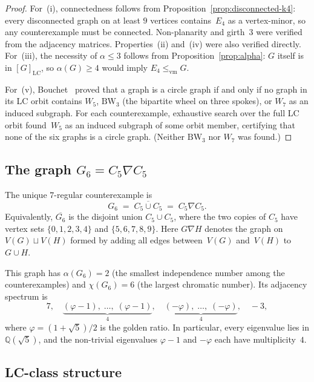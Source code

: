 \documentclass[11pt]{amsart}
\theoremstyle{definition}
\theoremstyle{remark}
\newcommand{\LC}{\mathrm{LC}}
\newcommand{\vm}{\leq_{\mathrm{vm}}}
\begin{document}
\begin{proof}
  For~(i), connectedness follows from
  Proposition~\ref{prop:disconnected-k4}: every disconnected graph on
  at least $9$ vertices contains~$E_4$ as a vertex-minor, so any
  counterexample must be connected.  Non-planarity and girth~$3$ were
  verified from the adjacency matrices.  Properties~(ii) and~(iv) were
  also verified directly.  For~(iii), the necessity of $\alpha\leq 3$
  follows from Proposition~\ref{prop:alpha}: $G$ itself is in
  $[G]_{\LC}$, so $\alpha(G)\geq 4$ would imply $E_4\vm G$.

  For~(v), Bouchet~\cite{Bouchet1994} proved that a graph is a circle
  graph if and only if no graph in its LC orbit contains $W_5$,
  $\mathrm{BW}_3$ (the bipartite wheel on three spokes), or $W_7$ as an
  induced subgraph.  For each
  counterexample, exhaustive search over the full LC orbit found~$W_5$
  as an induced subgraph of some orbit member, certifying that none of
  the six graphs is a circle graph.  (Neither $\mathrm{BW}_3$ nor $W_7$
  was found.)
\end{proof}


\subsection{The graph $G_6=C_5\nabla C_5$}

The unique $7$-regular counterexample is
\[
  G_6 \;=\; \overline{C_5\cup C_5} \;=\; C_5\nabla C_5.
\]
Equivalently, $\overline{G_6}$ is the disjoint union $C_5\cup C_5$,
where the two copies of $C_5$ have vertex sets $\{0,1,2,3,4\}$ and
$\{5,6,7,8,9\}$.  Here $G\nabla H$ denotes the
graph on $V(G)\sqcup V(H)$ formed by adding all edges between~$V(G)$
and~$V(H)$ to~$G\cup H$.

This graph has $\alpha(G_6)=2$ (the smallest independence number among
the counterexamples) and $\chi(G_6)=6$ (the largest chromatic number).
Its adjacency spectrum is
\[
  7,\quad
  \underbrace{(\varphi-1),\;\dots,\;(\varphi-1)}_{4},\quad
  \underbrace{(-\varphi),\;\dots,\;(-\varphi)}_{4},\quad
  -3,
\]
where $\varphi=(1+\sqrt{5})/2$ is the golden ratio.  In particular,
every eigenvalue lies in $\mathbb{Q}(\sqrt{5})$, and the non-trivial
eigenvalues $\varphi-1$ and $-\varphi$ each have multiplicity~$4$.


\subsection{LC-class structure}
\end{document}
